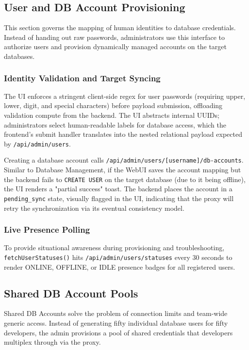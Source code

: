 \subsection{User and DB Account Provisioning}
This section governs the mapping of human identities to database credentials. Instead of handing out raw passwords, administrators use this interface to authorize users and provision dynamically managed accounts on the target databases.

\subsubsection{Identity Validation and Target Syncing}
The UI enforces a stringent client-side regex for user passwords (requiring upper, lower, digit, and special characters) before payload submission, offloading validation compute from the backend. The UI abstracts internal UUIDs; administrators select human-readable labels for database access, which the frontend's submit handler translates into the nested relational payload expected by \texttt{/api/admin/users}.

Creating a database account calls \texttt{/api/admin/users/[username]/db-accounts}. Similar to Database Management, if the WebUI saves the account mapping but the backend fails to \texttt{CREATE USER} on the target database (due to it being offline), the UI renders a "partial success" toast. The backend places the account in a \texttt{pending\_sync} state, visually flagged in the UI, indicating that the proxy will retry the synchronization via its eventual consistency model.

\subsubsection{Live Presence Polling}
To provide situational awareness during provisioning and troubleshooting, \texttt{fetchUserStatuses()} hits \texttt{/api/admin/users/statuses} every 30 seconds to render ONLINE, OFFLINE, or IDLE presence badges for all registered users.

\subsection{Shared DB Account Pools}
Shared DB Accounts solve the problem of connection limits and team-wide generic access. Instead of generating fifty individual database users for fifty developers, the admin provisions a pool of shared credentials that developers multiplex through via the proxy.

